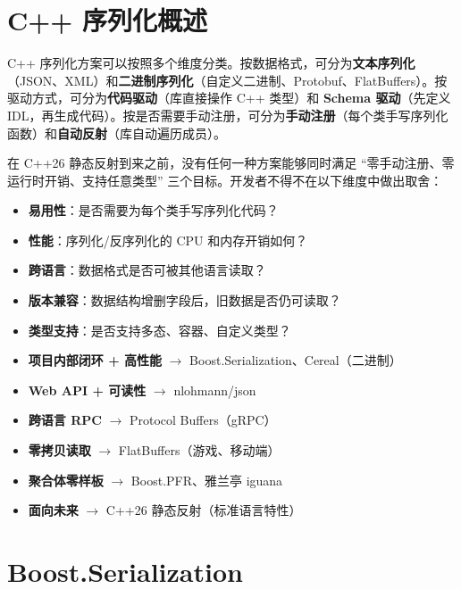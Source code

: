 \documentclass[12pt,a4paper,fontset=fandol]{ctexbook}
\begin{document}
\chapter{C++ 序列化概述}\label{ch:overview}

C++ 序列化方案可以按照多个维度分类。按数据格式，可分为\textbf{文本序列化}（JSON、XML）和\textbf{二进制序列化}（自定义二进制、Protobuf、FlatBuffers）。按驱动方式，可分为\textbf{代码驱动}（库直接操作 C++ 类型）和 \textbf{Schema 驱动}（先定义 IDL，再生成代码）。按是否需要手动注册，可分为\textbf{手动注册}（每个类手写序列化函数）和\textbf{自动反射}（库自动遍历成员）。

在 C++26 静态反射到来之前，没有任何一种方案能够同时满足 ``零手动注册、零运行时开销、支持任意类型'' 三个目标。开发者不得不在以下维度中做出取舍：

\begin{itemize}
  \item \textbf{易用性}：是否需要为每个类手写序列化代码？
  \item \textbf{性能}：序列化/反序列化的 CPU 和内存开销如何？
  \item \textbf{跨语言}：数据格式是否可被其他语言读取？
  \item \textbf{版本兼容}：数据结构增删字段后，旧数据是否仍可读取？
  \item \textbf{类型支持}：是否支持多态、容器、自定义类型？
\end{itemize}

\begin{guideline}[title={C++ 序列化方案选型速查}]
\begin{itemize}[nosep]
  \item \textbf{项目内部闭环 + 高性能} $\to$ Boost.Serialization、Cereal（二进制）
  \item \textbf{Web API + 可读性} $\to$ nlohmann/json
  \item \textbf{跨语言 RPC} $\to$ Protocol Buffers（gRPC）
  \item \textbf{零拷贝读取} $\to$ FlatBuffers（游戏、移动端）
  \item \textbf{聚合体零样板} $\to$ Boost.PFR、雅兰亭 iguana
  \item \textbf{面向未来} $\to$ C++26 静态反射（标准语言特性）
\end{itemize}
\end{guideline}

\chapter{Boost.Serialization}\label{ch:boost}
\end{document}

